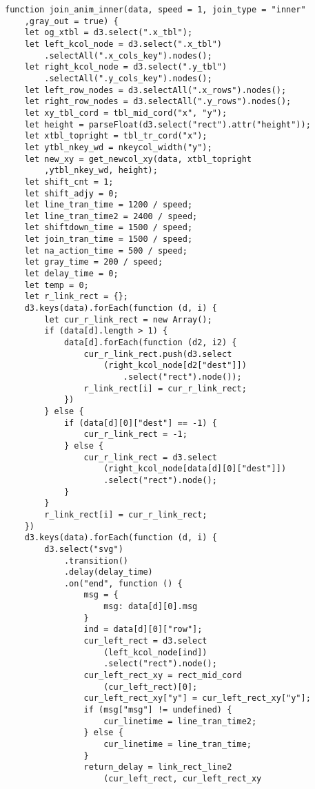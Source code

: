 \begin{lstlisting}
function join_anim_inner(data, speed = 1, join_type = "inner"
    ,gray_out = true) {
    let og_xtbl = d3.select(".x_tbl");
    let left_kcol_node = d3.select(".x_tbl")
        .selectAll(".x_cols_key").nodes();
    let right_kcol_node = d3.select(".y_tbl")
        .selectAll(".y_cols_key").nodes();
    let left_row_nodes = d3.selectAll(".x_rows").nodes();
    let right_row_nodes = d3.selectAll(".y_rows").nodes();
    let xy_tbl_cord = tbl_mid_cord("x", "y");
    let height = parseFloat(d3.select("rect").attr("height"));
    let xtbl_topright = tbl_tr_cord("x");
    let ytbl_nkey_wd = nkeycol_width("y");
    let new_xy = get_newcol_xy(data, xtbl_topright
        ,ytbl_nkey_wd, height);
    let shift_cnt = 1;
    let shift_adjy = 0;
    let line_tran_time = 1200 / speed;
    let line_tran_time2 = 2400 / speed;
    let shiftdown_time = 1500 / speed;
    let join_tran_time = 1500 / speed;
    let na_action_time = 500 / speed;
    let gray_time = 200 / speed;
    let delay_time = 0;
    let temp = 0;
    let r_link_rect = {};
    d3.keys(data).forEach(function (d, i) {
        let cur_r_link_rect = new Array();
        if (data[d].length > 1) {
            data[d].forEach(function (d2, i2) {
                cur_r_link_rect.push(d3.select
                    (right_kcol_node[d2["dest"]])
                        .select("rect").node());
                r_link_rect[i] = cur_r_link_rect;
            })
        } else {
            if (data[d][0]["dest"] == -1) {
                cur_r_link_rect = -1;
            } else {
                cur_r_link_rect = d3.select
                    (right_kcol_node[data[d][0]["dest"]])
                    .select("rect").node();
            }
        }
        r_link_rect[i] = cur_r_link_rect;
    })
    d3.keys(data).forEach(function (d, i) {
        d3.select("svg")
            .transition()
            .delay(delay_time)
            .on("end", function () {
                msg = {
                    msg: data[d][0].msg
                }
                ind = data[d][0]["row"];
                cur_left_rect = d3.select
                    (left_kcol_node[ind])
                    .select("rect").node();
                cur_left_rect_xy = rect_mid_cord
                    (cur_left_rect)[0];
                cur_left_rect_xy["y"] = cur_left_rect_xy["y"];
                if (msg["msg"] != undefined) {
                    cur_linetime = line_tran_time2;
                } else {
                    cur_linetime = line_tran_time;
                }
                return_delay = link_rect_line2
                    (cur_left_rect, cur_left_rect_xy

\end{lstlisting}
